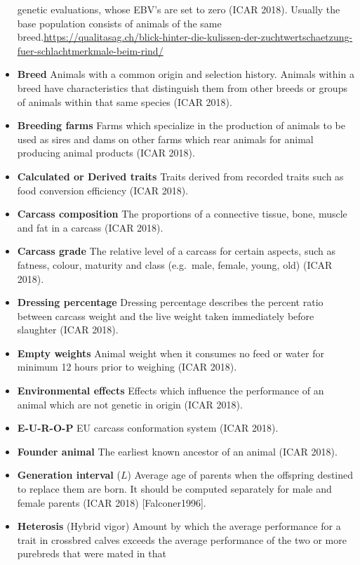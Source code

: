 \documentclass[]{article}
\begin{document}
\begin{itemize}
  genetic evaluations, whose EBV's are set to zero (ICAR 2018). Usually
  the base population consists of animals of the same
  breed.\url{https://qualitasag.ch/blick-hinter-die-kulissen-der-zuchtwertschaetzung-fuer-schlachtmerkmale-beim-rind/}
\item
  \textbf{Breed} Animals with a common origin and selection history.
  Animals within a breed have characteristics that distinguish them from
  other breeds or groups of animals within that same species (ICAR
  2018).
\item
  \textbf{Breeding farms} Farms which specialize in the production of
  animals to be used as sires and dams on other farms which rear animals
  for animal producing animal products (ICAR 2018).
\item
  \textbf{Calculated or Derived traits} Traits derived from recorded
  traits such as food conversion efficiency (ICAR 2018).
\item
  \textbf{Carcass composition} The proportions of a connective tissue,
  bone, muscle and fat in a carcass (ICAR 2018).
\item
  \textbf{Carcass grade} The relative level of a carcass for certain
  aspects, such as fatness, colour, maturity and class (e.g.~male,
  female, young, old) (ICAR 2018).
\item
  \textbf{Dressing percentage} Dressing percentage describes the percent
  ratio between carcass weight and the live weight taken immediately
  before slaughter (ICAR 2018).
\item
  \textbf{Empty weights} Animal weight when it consumes no feed or water
  for minimum 12 hours prior to weighing (ICAR 2018).
\item
  \textbf{Environmental effects} Effects which influence the performance
  of an animal which are not genetic in origin (ICAR 2018).
\item
  \textbf{E-U-R-O-P} EU carcass conformation system (ICAR 2018).
\item
  \textbf{Founder animal} The earliest known ancestor of an animal (ICAR
  2018).
\item
  \textbf{Generation interval} (\(L\)) Average age of parents when the
  offspring destined to replace them are born. It should be computed
  separately for male and female parents (ICAR 2018) {[}Falconer1996{]}.
\item
  \textbf{Heterosis} (Hybrid vigor) Amount by which the average
  performance for a trait in crossbred calves exceeds the average
  performance of the two or more purebreds that were mated in that

\end{itemize}
\end{document}

